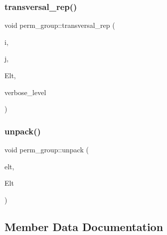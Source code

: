 \mbox{\label{classperm__group_aa130471f79beeba3b229d1fc796cf55c}} 
\subsubsection{\texorpdfstring{transversal\+\_\+rep()}{transversal\_rep()}}
{\footnotesize\ttfamily void perm\+\_\+group\+::transversal\+\_\+rep (\begin{DoxyParamCaption}\item[{\mbox{\hyperlink{galois_8h_a09fddde158a3a20bd2dcadb609de11dc}{I\+NT}}}]{i,  }\item[{\mbox{\hyperlink{galois_8h_a09fddde158a3a20bd2dcadb609de11dc}{I\+NT}}}]{j,  }\item[{\mbox{\hyperlink{galois_8h_a09fddde158a3a20bd2dcadb609de11dc}{I\+NT}} $\ast$}]{Elt,  }\item[{\mbox{\hyperlink{galois_8h_a09fddde158a3a20bd2dcadb609de11dc}{I\+NT}}}]{verbose\+\_\+level }\end{DoxyParamCaption})}

\mbox{\label{classperm__group_a78c7375293191bb34de69dc54a99e4ff}} 
\subsubsection{\texorpdfstring{unpack()}{unpack()}}
{\footnotesize\ttfamily void perm\+\_\+group\+::unpack (\begin{DoxyParamCaption}\item[{\mbox{\hyperlink{galois_8h_a122c4acf389c050379f00341fdcd5812}{U\+B\+Y\+TE}} $\ast$}]{elt,  }\item[{\mbox{\hyperlink{galois_8h_a09fddde158a3a20bd2dcadb609de11dc}{I\+NT}} $\ast$}]{Elt }\end{DoxyParamCaption})}



\subsection{Member Data Documentation}
\mbox{\label{classperm__group_a0c250c39dff029a65222a0aa7d9f48d7}} 
